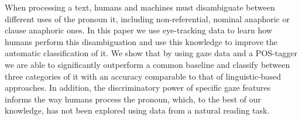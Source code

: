 When processing a text, humans and machines must disambiguate between different uses of the pronoun it, including non-referential, nominal anaphoric or clause anaphoric ones. In this paper we use eye-tracking data to learn how humans perform this disambiguation and use this knowledge to improve the automatic classification of it. We show that by using gaze data and a POS-tagger we are able to significantly outperform a common baseline and classify between three categories of it with an accuracy comparable to that of linguistic-based approaches.  In addition, the discriminatory power of specific gaze features informs the way humans process the pronoun, which, to the best of our knowledge, has not been explored using data from a natural reading task.

